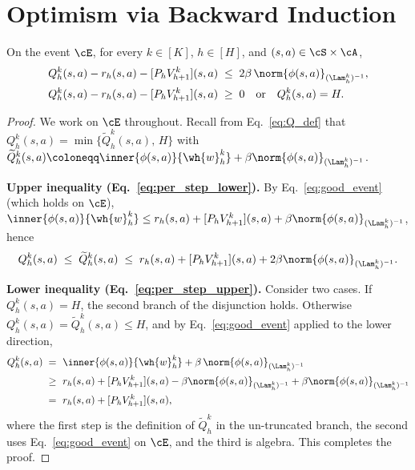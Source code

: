 \section{Optimism via Backward Induction}\label{sec:optimism}

\begin{lemma}\label{lem:per-step}
On the event $\cE$, for every $k \in [K]$, $h \in [H]$, and $(s, a) \in \cS \times \cA$,
\begin{align}\label{eq:per_step_lower}
Q_h^k(s, a) - r_h(s, a) - [P_h V_{h+1}^k](s, a) &\;\le\; 2 \beta\, \norm{\phi(s, a)}_{(\Lam_h^k)^{-1}}, \\
Q_h^k(s, a) - r_h(s, a) - [P_h V_{h+1}^k](s, a) &\;\ge\; 0
\quad \text{or}\quad Q_h^k(s, a) = H. \label{eq:per_step_upper}
\end{align}
\end{lemma}

\begin{proof}
We work on $\cE$ throughout. Recall from Eq.~\eqref{eq:Q_def} that $Q_h^k(s, a) = \min\{ \widetilde{Q}_h^k(s, a),\, H \}$ with $\widetilde{Q}_h^k(s, a) \coloneqq \inner{\phi(s, a)}{\wh{w}_h^k} + \beta \norm{\phi(s, a)}_{(\Lam_h^k)^{-1}}$.

\textbf{Upper inequality (Eq.~\eqref{eq:per_step_lower}).} By Eq.~\eqref{eq:good_event} (which holds on $\cE$), $\inner{\phi(s,a)}{\wh{w}_h^k} \le r_h(s,a) + [P_h V_{h+1}^k](s,a) + \beta \norm{\phi(s,a)}_{(\Lam_h^k)^{-1}}$, hence
\begin{align*}
Q_h^k(s, a) \;\le\; \widetilde{Q}_h^k(s, a)
\;\le\; r_h(s, a) + [P_h V_{h+1}^k](s, a) + 2 \beta \norm{\phi(s, a)}_{(\Lam_h^k)^{-1}}.
\end{align*}

\textbf{Lower inequality (Eq.~\eqref{eq:per_step_upper}).} Consider two cases. If $Q_h^k(s,a) = H$, the second branch of the disjunction holds. Otherwise $Q_h^k(s, a) = \widetilde{Q}_h^k(s, a) \le H$, and by Eq.~\eqref{eq:good_event} applied to the lower direction,
\begin{align*}
Q_h^k(s, a)
\;=\; & ~ \inner{\phi(s, a)}{\wh{w}_h^k} + \beta\, \norm{\phi(s, a)}_{(\Lam_h^k)^{-1}} \\
\;\ge\; & ~ r_h(s, a) + [P_h V_{h+1}^k](s, a) - \beta \norm{\phi(s, a)}_{(\Lam_h^k)^{-1}} + \beta \norm{\phi(s, a)}_{(\Lam_h^k)^{-1}} \\
\;=\; & ~ r_h(s, a) + [P_h V_{h+1}^k](s, a),
\end{align*}
where the first step is the definition of $\widetilde{Q}_h^k$ in the un-truncated branch, the second uses Eq.~\eqref{eq:good_event} on $\cE$, and the third is algebra. This completes the proof.
\end{proof}

